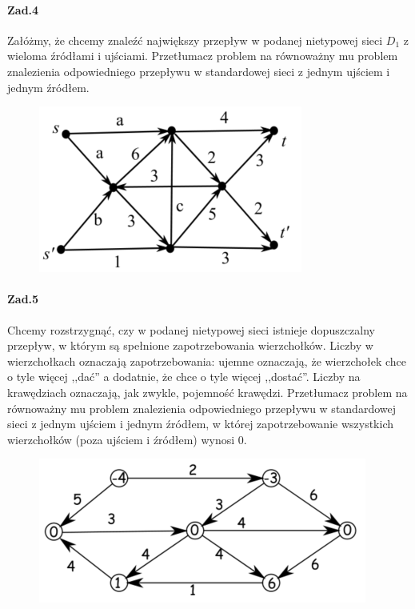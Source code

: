 \documentclass[a4paper,12pt]{article}
\theoremstyle{definition}%
\theoremstyle{definition}
\theoremstyle{problem}
\begin{document}
\paragraph{Zad.4} Załóżmy, że chcemy znaleźć największy przepływ w podanej nietypowej sieci $D_1$ z wieloma źródłami i ujściami. Przetłumacz problem na równoważny mu problem znalezienia odpowiedniego przepływu w standardowej sieci z jednym ujściem i jednym źródłem.
\begin{figure}[H]
\centering
\includegraphics[width=.8\textwidth]{img/6_Z4}
\end{figure}

\paragraph{Zad.5} Chcemy rozstrzygnąć, czy w podanej nietypowej sieci istnieje dopuszczalny przepływ, w którym są spełnione zapotrzebowania wierzchołków. Liczby w wierzchołkach oznaczają zapotrzebowania: ujemne oznaczają, że wierzchołek chce o tyle więcej ,,dać” a dodatnie, że chce o tyle więcej ,,dostać”. Liczby na krawędziach oznaczają, jak zwykle, pojemność krawędzi. Przetłumacz problem na równoważny mu problem znalezienia odpowiedniego przepływu w standardowej sieci z jednym ujściem i jednym źródłem, w której zapotrzebowanie wszystkich wierzchołków (poza ujściem i źródłem) wynosi 0.
\begin{figure}[H]
\centering
\includegraphics[width=.8\textwidth]{img/6_Z5}
\end{figure}
\end{document}
